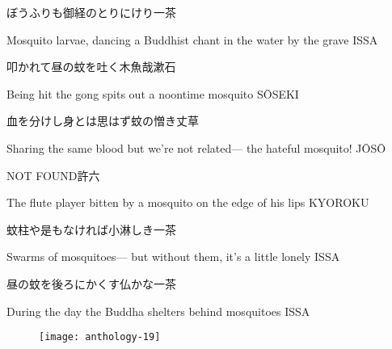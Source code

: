 \begin{haiku}
    {\FH ぼうふりも御経のとりにけり}\hfill{\FH 一茶}

    \vin{} Mosquito larvae,
    \vin{} \vin{} dancing a Buddhist chant
    \vin{} \vin{} \vin{} in the water by the grave \hspace{\fill} ISSA
\end{haiku}

\begin{haiku}
    {\FH 叩かれて昼の蚊を吐く木魚哉}\hfill{\FH 漱石}

    \vin{} Being hit
    \vin{} \vin{} the gong spits out
    \vin{} \vin{} \vin{} a noontime mosquito \hspace{\fill} S\={O}SEKI
\end{haiku}

\begin{haiku}
    {\FH 血を分けし身とは思はず蚊の憎き}\hfill{\FH 丈草}

    \vin{} Sharing the same blood
    \vin{} \vin{} but we're not related---
    \vin{} \vin{} \vin{} the hateful mosquito! \hspace{\fill} J\={O}S\={O}
\end{haiku}

\begin{haiku}
    {NOT FOUND}\hfill{\FH 許六}

    \vin{} The flute player
    \vin{} \vin{} bitten by a mosquito
    \vin{} \vin{} \vin{} on the edge of his lips \hspace{\fill} KYOROKU
\end{haiku}

\begin{haiku}
    {\FH 蚊柱や是もなければ小淋しき}\hfill{\FH 一茶}

    \vin{} Swarms of mosquitoes---
    \vin{} \vin{} but without them,
    \vin{} \vin{} \vin{} it's a little lonely \hspace{\fill} ISSA
\end{haiku}

\begin{haiku}
    {\FH 昼の蚊を後ろにかくす仏かな}\hfill{\FH 一茶}

    \vin{} During the day
    \vin{} \vin{} the Buddha shelters behind
    \vin{} \vin{} \vin{} mosquitoes \hspace{\fill} ISSA
\end{haiku}

\begin{figure}
    \texttt{[image: anthology-19]}
\end{figure}

